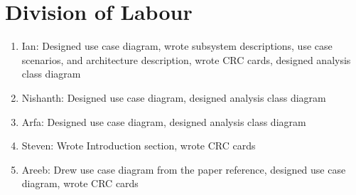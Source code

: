 \documentclass[]{article}
\begin{document}
\appendix
\section{Division of Labour}
\label{sec:division_of_labour}
\begin{enumerate}
	\item Ian: Designed use case diagram, wrote subsystem descriptions, use case scenarios, and architecture description, wrote CRC cards, designed analysis class diagram
	\item Nishanth: Designed use case diagram, designed analysis class diagram
	\item Arfa: Designed use case diagram, designed analysis class diagram
	\item Steven: Wrote Introduction section, wrote CRC cards
	\item Areeb: Drew use case diagram from the paper reference, designed use case diagram, wrote CRC cards
\end{enumerate}

\end{document}
